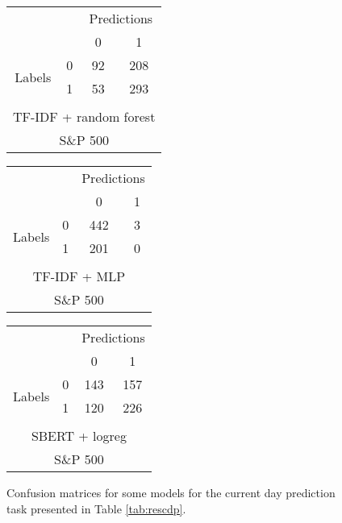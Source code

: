\begin{figure}[h]
    \centering
    \begin{tabular}{cccc}
     & & \multicolumn{2}{c}{Predictions} \\
     & & \multicolumn{1}{|c|}{0} & \multicolumn{1}{c|}{1}\\
      \cline{2-4}
     \multirow{2}{*}{Labels} & 0 & \multicolumn{1}{|c|}{92} &  \multicolumn{1}{c|}{208} \\
      & 1 & \multicolumn{1}{|c|}{53} & \multicolumn{1}{c|}{293} \\ 
      \\ \multicolumn{4}{c}{TF-IDF + random forest} \\ \multicolumn{4}{c}{S\&P 500}
\end{tabular} \hspace{1em}
\begin{tabular}{cccc}
     & & \multicolumn{2}{c}{Predictions} \\
     & & \multicolumn{1}{|c|}{0} & \multicolumn{1}{c|}{1}\\
      \cline{2-4}
     \multirow{2}{*}{Labels} & 0 & \multicolumn{1}{|c|}{442} &  \multicolumn{1}{c|}{3} \\
      & 1 & \multicolumn{1}{|c|}{201} & \multicolumn{1}{c|}{0} \\ 
      \\ \multicolumn{4}{c}{TF-IDF + MLP}
      \\ \multicolumn{4}{c}{S\&P 500}
\end{tabular} \hspace{1em}
\begin{tabular}{cccc}
     & & \multicolumn{2}{c}{Predictions} \\
     & & \multicolumn{1}{|c|}{0} & \multicolumn{1}{c|}{1}\\
      \cline{2-4}
     \multirow{2}{*}{Labels} & 0 & \multicolumn{1}{|c|}{143} &  \multicolumn{1}{c|}{157} \\
      & 1 & \multicolumn{1}{|c|}{120} & \multicolumn{1}{c|}{226} \\ 
      \\ \multicolumn{4}{c}{SBERT + logreg}
      \\ \multicolumn{4}{c}{S\&P 500}
\end{tabular}
    \caption{Confusion matrices for some models for the current day prediction task presented in Table \ref{tab:rescdp}.}
    \label{tab:confmat_cdp}
\end{figure}
